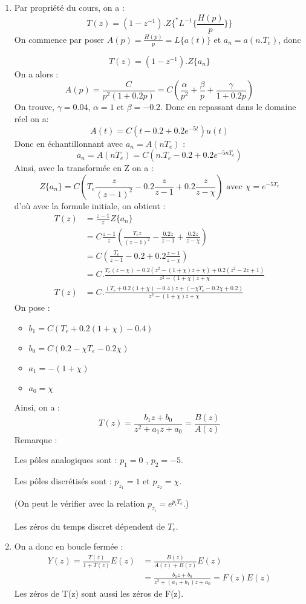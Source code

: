 \documentclass[../main.tex]{subfiles}
\begin{document}
\begin{enumerate}
\item Par propriété du cours, on a :
\[T(z) = (1-z^{-1}).Z\{^*L^{-1}\{\frac{H(p)}{p}\}\}\]
On commence par poser $A(p)=\frac{H(p)}{p}=L\{a(t)\}$ et $a_n = a(n.T_e)$, donc

\[T(z) = (1-z^{-1}).Z\{a_n\}\]
On a alors :
\[A(p) = \frac{C}{p^2(1+0.2p)} = C(\frac{\alpha}{p^2}+\frac{\beta}{p}+\frac{\gamma}{1+0.2p})\]
On trouve, $\gamma = 0.04$, $\alpha = 1$ et $\beta=-0.2$. Donc en repassant dans le domaine réel on a:
\[A(t) = C(t-0.2+0.2e^{-5t})u(t)\]
Donc en échantillonnant avec $a_n=A(nT_e)$ :
\[a_n=A(nT_e)=C(n.T_e-0.2 + 0.2e^{-5nT_e})\]
Ainsi, avec la transformée en Z on a :
\[Z\{a_n\}=C(T_e\frac{z}{(z-1)^2}-0.2\frac{z}{z-1}+0.2\frac{z}{z-\chi}) \text{ avec } \chi = e^{-5T_e}\]
d'où avec la formule initiale, on obtient :
\begin{align*}
T(z) &= \frac{z-1}{z}Z\{a_n\}\\
&= C\frac{z-1}{z}(\frac{T_ez}{(z-1)^2}-\frac{0.2z}{z-1}+\frac{0.2z}{z-\chi})\\
&= C(\frac{T_e}{z-1}-0.2+0.2\frac{z-1}{z-\chi})\\
&= C.\frac{T_e(z-\chi)-0.2(z^2-(1+\chi)z+\chi)+0.2(z^2-2z+1)}{z^2-(1+\chi)z+\chi}\\
T(z) &= C.\frac{(T_e+0.2(1+\chi)-0.4)z +(-\chi T_e-0.2\chi+0.2)}{z^2-(1+\chi)z+\chi}
\end{align*}
\medbreak
On pose :\begin{itemize}
\item $b_1 = C(T_e+0.2(1+\chi)-0.4)$
\item $b_0 = C(0.2-\chi T_e-0.2\chi)$
\item $a_1 = -(1+\chi)$
\item $a_0 = \chi$
\end{itemize}
\bigbreak
\noindent Ainsi, on a :
\[T(z) = \frac{b_1z+b_0}{z^2+a_1z+a_0}=\frac{B(z)}{A(z)}\]
\medbreak
\noindent Remarque :

Les pôles analogiques sont : $p_1=0$ , $p_2 = -5$.

Les pôles discrétisés sont : $p_{z_1}=1$ et $p_{z_2} = \chi$.

(On peut le vérifier avec la relation $p_{z_i}=e^{p_iT_e}$.)

Les zéros du temps discret dépendent de $T_e$.\\

\item On a donc en boucle fermée :
\begin{align*}
Y(z) = \frac{T(z)}{1+T(z)}E(z)&=\frac{B(z)}{A(z) + B(z)}E(z)\\
&=\frac{b_1z+b_0}{z^2+(a_1+b_1)z+a_0} =F(z) E(z)
\end{align*}
Les zéros de T(z) sont aussi les zéros de F(z).\\


\end{enumerate}
\end{document}
